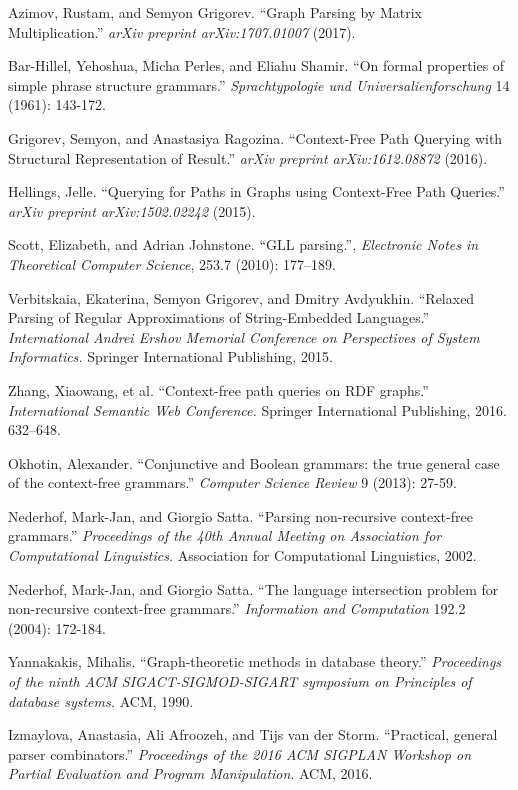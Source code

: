 \documentclass{vldb}
\begin{document}
\begin{thebibliography}{9}

   Azimov, Rustam, and Semyon Grigorev.
   ``Graph Parsing by Matrix Multiplication.''
   \emph{arXiv preprint arXiv:1707.01007}
   (2017).

   Bar-Hillel, Yehoshua, Micha Perles, and Eliahu Shamir.
   ``On formal properties of simple phrase structure grammars.''
   \emph{Sprachtypologie und Universalienforschung}
   14 (1961): 143-172.

  Grigorev, Semyon, and Anastasiya Ragozina. 
  ``Context-Free Path Querying with Structural Representation of Result.''
   \emph{arXiv preprint arXiv:1612.08872}
    (2016).

  Hellings, Jelle.
  ``Querying for Paths in Graphs using Context-Free Path Queries.''
  \emph{arXiv preprint arXiv:1502.02242} (2015).

  Scott, Elizabeth, and Adrian Johnstone.   
  ``GLL parsing.'',
  \emph{Electronic Notes in Theoretical Computer Science},
  253.7 (2010): 177--189.

  Verbitskaia, Ekaterina, Semyon Grigorev, and Dmitry Avdyukhin.
  ``Relaxed Parsing of Regular Approximations of String-Embedded Languages.''
  \emph{International Andrei Ershov Memorial Conference on Perspectives of System Informatics.}
  Springer International Publishing, 2015.

  Zhang, Xiaowang, et al.
  ``Context-free path queries on RDF graphs.'' 
  \emph{International Semantic Web Conference.}
   Springer International Publishing, 2016.
   632--648.

  Okhotin, Alexander.
  ``Conjunctive and Boolean grammars: the true general case of the context-free grammars.''
  \emph{Computer Science Review} 9 (2013): 27-59.

  Nederhof, Mark-Jan, and Giorgio Satta.
  ``Parsing non-recursive context-free grammars.''
  \emph{Proceedings of the 40th Annual Meeting on Association for Computational Linguistics.}
  Association for Computational Linguistics, 2002.

  Nederhof, Mark-Jan, and Giorgio Satta.
  ``The language intersection problem for non-recursive context-free grammars.''
  \emph{Information and Computation} 192.2 (2004): 172-184.

  Yannakakis, Mihalis.
  ``Graph-theoretic methods in database theory.''
  \emph{Proceedings of the ninth ACM SIGACT-SIGMOD-SIGART symposium on Principles of database systems.}
   ACM, 1990.

  Izmaylova, Anastasia, Ali Afroozeh, and Tijs van der Storm.
  ``Practical, general parser combinators.''
  \emph{Proceedings of the 2016 ACM SIGPLAN Workshop on Partial Evaluation and Program Manipulation}. ACM, 2016.   
   
\end{thebibliography}
\end{document}
